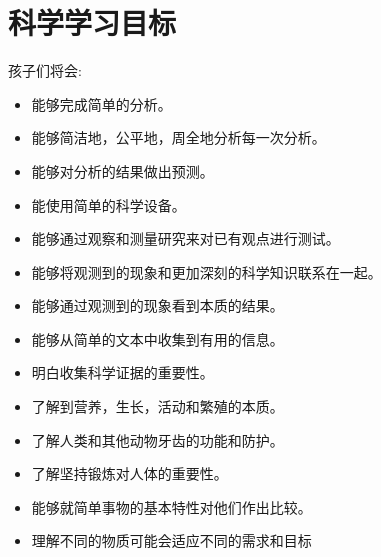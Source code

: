 \chapter{科学学习目标}
   孩子们将会: \par
   \begin{itemize}
      \item 能够完成简单的分析。
      \item 能够简洁地，公平地，周全地分析每一次分析。 
      \item 能够对分析的结果做出预测。
      \item 能使用简单的科学设备。
      \item 能够通过观察和测量研究来对已有观点进行测试。
      \item 能够将观测到的现象和更加深刻的科学知识联系在一起。
      \item 能够通过观测到的现象看到本质的结果。
      \item 能够从简单的文本中收集到有用的信息。
      \item 明白收集科学证据的重要性。
      \item 了解到营养，生长，活动和繁殖的本质。
      \item 了解人类和其他动物牙齿的功能和防护。
      \item 了解坚持锻炼对人体的重要性。
      \item 能够就简单事物的基本特性对他们作出比较。
      \item 理解不同的物质可能会适应不同的需求和目标
   \end{itemize}  
